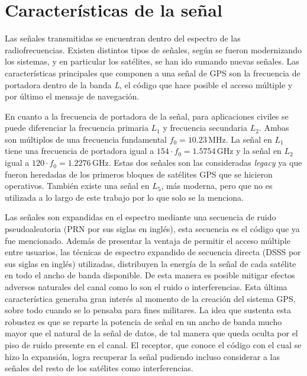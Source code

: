 \documentclass[a4paper,12pt,oneside,onecolumn,final,openright]{book}%
\begin{document}
\section{Características de la señal}\label{sec:senial}
	Las señales transmitidas se encuentran dentro del espectro de las radiofrecuencias. Existen distintos tipos de señales, según se fueron modernizando los sistemas, y en particular los satélites, se han ido sumando nuevas señales. Las características principales que componen a una señal de GPS son la frecuencia de portadora dentro de la banda \textit{L}, el código que hace posible el acceso múltiple y por último el mensaje de navegación.
	
	En cuanto a la frecuencia de portadora de la señal, para aplicaciones civiles se puede diferenciar la frecuencia primaria $L_1$ y frecuencia secundaria $L_2$. Ambas son múltiplos de una frecuencia fundamental $f_0=10.23$\,MHz. La señal en $L_1$ tiene una frecuencia de portadora igual a $154\cdot f_0 = 1.5754$\,GHz y la señal en $L_2$ igual a $120\cdot f_0 = 1.2276$\,GHz. Estas dos señales son las consideradas \textit{legacy} ya que fueron heredadas de los primeros bloques de satélites GPS que se hicieron operativos. También existe una señal en $L_5$, más moderna, pero que no es utilizada a lo largo de este trabajo por lo que solo se la menciona.
	
	Las señales son expandidas en el espectro mediante una secuencia de ruido pseudoaleatoria (PRN por sus siglas en inglés), esta secuencia es el código que ya fue mencionado. Además de presentar la ventaja de permitir el acceso múltiple entre usuarios, las técnicas de espectro expandido de secuencia directa (DSSS por sus siglas en inglés) utilizadas, distribuyen la energía de la señal de cada satélite en todo el ancho de banda disponible. De esta manera es posible mitigar efectos adversos naturales del canal como lo son el ruido o interferencias. Esta última característica generaba gran interés al momento de la creación del sistema GPS, sobre todo cuando se lo pensaba para fines militares. La idea que sustenta esta robustez es que se reparte la potencia de señal en un ancho de banda mucho mayor que el natural de la señal de datos, de tal manera que queda oculta por el piso de ruido presente en el canal. El receptor, que conoce el código con el cual se hizo la expansión, logra recuperar la señal pudiendo incluso considerar a las señales del resto de los satélites como interferencias.
	
\end{document}

